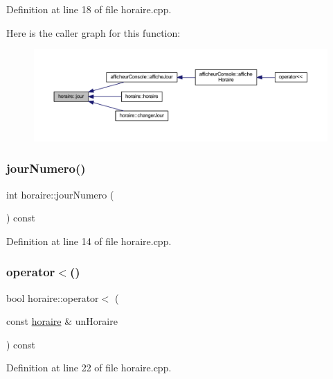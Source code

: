 Definition at line 18 of file horaire.\+cpp.

Here is the caller graph for this function\+:\nopagebreak
\begin{figure}[H]
\begin{center}
\leavevmode
\includegraphics[width=350pt]{classhoraire_a974c25bda0b56a5abcfa64de32a6ccf0_icgraph}
\end{center}
\end{figure}
\hypertarget{classhoraire_a958470c23ace8be3f5b93aab1183ade3}{}\label{classhoraire_a958470c23ace8be3f5b93aab1183ade3} 
\subsubsection{\texorpdfstring{jour\+Numero()}{jourNumero()}}
{\footnotesize\ttfamily int horaire\+::jour\+Numero (\begin{DoxyParamCaption}{ }\end{DoxyParamCaption}) const}



Definition at line 14 of file horaire.\+cpp.

\hypertarget{classhoraire_a2298ab292853652b934f7b881114ff12}{}\label{classhoraire_a2298ab292853652b934f7b881114ff12} 
\subsubsection{\texorpdfstring{operator$<$()}{operator<()}}
{\footnotesize\ttfamily bool horaire\+::operator$<$ (\begin{DoxyParamCaption}\item[{const \hyperlink{classhoraire}{horaire} \&}]{un\+Horaire }\end{DoxyParamCaption}) const}



Definition at line 22 of file horaire.\+cpp.

\hypertarget{classhoraire_a17aee5b647b4dff3d516e3fbccfb0d53}{}\label{classhoraire_a17aee5b647b4dff3d516e3fbccfb0d53} 
